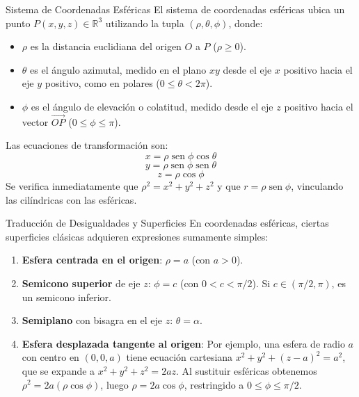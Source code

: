\documentclass[11pt,a4paper]{article}
\begin{document}
\begin{definicionbox}{Sistema de Coordenadas Esféricas}
El sistema de coordenadas esféricas ubica un punto $P(x,y,z) \in \mathbb{R}^3$ utilizando la tupla $(\rho, \theta, \phi)$, donde:
\begin{itemize}
    \item $\rho$ es la distancia euclidiana del origen $O$ a $P$ ($\rho \geq 0$).
    \item $\theta$ es el ángulo azimutal, medido en el plano $xy$ desde el eje $x$ positivo hacia el eje $y$ positivo, como en polares ($0 \leq \theta < 2\pi$).
    \item $\phi$ es el ángulo de elevación o colatitud, medido desde el eje $z$ positivo hacia el vector $\vec{OP}$ ($0 \leq \phi \leq \pi$).
\end{itemize}
Las ecuaciones de transformación son:
\[ x = \rho \operatorname{sen} \phi \cos \theta \]
\[ y = \rho \operatorname{sen} \phi \operatorname{sen} \theta \]
\[ z = \rho \cos \phi \]
Se verifica inmediatamente que $\rho^2 = x^2 + y^2 + z^2$ y que $r = \rho \operatorname{sen} \phi$, vinculando las cilíndricas con las esféricas.
\end{definicionbox}

\begin{teoremabox}{Traducción de Desigualdades y Superficies}
En coordenadas esféricas, ciertas superficies clásicas adquieren expresiones sumamente simples:
\begin{enumerate}
    \item \textbf{Esfera centrada en el origen}: $\rho = a$ (con $a > 0$).
    \item \textbf{Semicono superior} de eje $z$: $\phi = c$ (con $0 < c < \pi/2$). Si $c \in (\pi/2, \pi)$, es un semicono inferior.
    \item \textbf{Semiplano} con bisagra en el eje $z$: $\theta = \alpha$.
    \item \textbf{Esfera desplazada tangente al origen}: Por ejemplo, una esfera de radio $a$ con centro en $(0,0,a)$ tiene ecuación cartesiana $x^2 + y^2 + (z-a)^2 = a^2$, que se expande a $x^2 + y^2 + z^2 = 2az$. Al sustituir esféricas obtenemos $\rho^2 = 2a (\rho \cos \phi)$, luego $\rho = 2a \cos \phi$, restringido a $0 \leq \phi \leq \pi/2$.
\end{enumerate}
\end{teoremabox}
\end{document}
